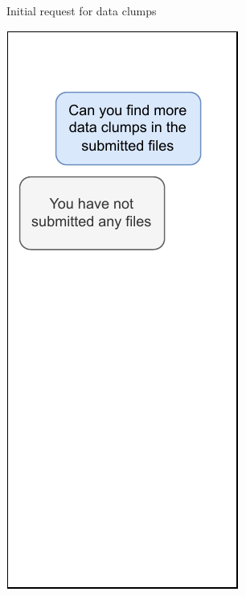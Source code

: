 {\begin{figure}
\begin{adjustbox}{minipage=\linewidth,scale=0.7}
\begin{subfigure}[b]{0.3\textwidth}
         \caption{Initial request for data clumps}
        \label{fig:llm_stateless1}
     \end{subfigure}
     \hfill
     \begin{subfigure}[b]{0.30\textwidth}
         \centering
         \includegraphics[width=\textwidth]{figures/chapter2/chatgpt_stateless_2.drawio.pdf}

\end{subfigure}
\end{adjustbox}
\end{figure}}
